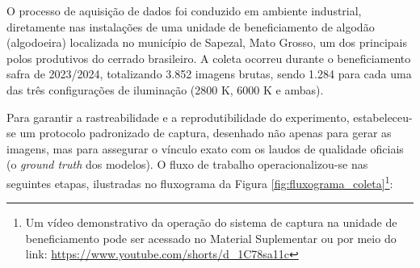 
O processo de aquisição de dados foi conduzido em ambiente industrial, diretamente nas instalações de uma unidade de beneficiamento de algodão (algodoeira) localizada no município de Sapezal, Mato Grosso, um dos principais polos produtivos do cerrado brasileiro. A coleta ocorreu durante o beneficiamento safra de 2023/2024, totalizando 3.852 imagens brutas, sendo 1.284 para cada uma das três configurações de iluminação (2800 K, 6000 K e ambas).
    
Para garantir a rastreabilidade e a reprodutibilidade do experimento, estabeleceu-se um protocolo padronizado de captura, desenhado não apenas para gerar as imagens, mas para assegurar o vínculo exato com os laudos de qualidade oficiais (o \textit{ground truth} dos modelos). O fluxo de trabalho operacionalizou-se nas seguintes etapas, ilustradas no fluxograma da Figura \ref{fig:fluxograma_coleta}\footnote{Um vídeo demonstrativo da operação do sistema de captura na unidade de beneficiamento pode ser acessado no Material Suplementar ou por meio do link: \url{https://www.youtube.com/shorts/d_1C78sa11c}}:

